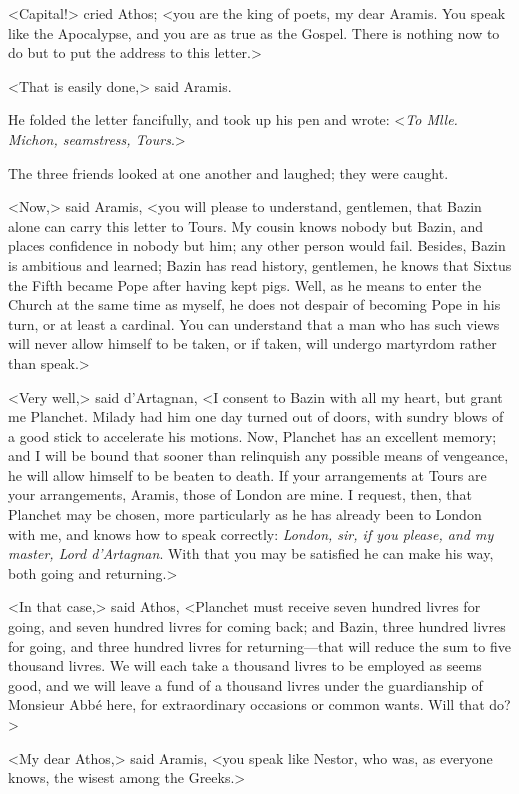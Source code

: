 <Capital!> cried Athos; <you are the king of poets, my dear Aramis. You speak like the Apocalypse, and you are as true as the Gospel. There is nothing now to do but to put the address to this letter.> 

<That is easily done,> said Aramis. 

He folded the letter fancifully, and took up his pen and wrote: <\textit{To Mlle. Michon, seamstress, Tours}.> 

The three friends looked at one another and laughed; they were caught. 

<Now,> said Aramis, <you will please to understand, gentlemen, that Bazin alone can carry this letter to Tours. My cousin knows nobody but Bazin, and places confidence in nobody but him; any other person would fail. Besides, Bazin is ambitious and learned; Bazin has read history, gentlemen, he knows that Sixtus the Fifth became Pope after having kept pigs. Well, as he means to enter the Church at the same time as myself, he does not despair of becoming Pope in his turn, or at least a cardinal. You can understand that a man who has such views will never allow himself to be taken, or if taken, will undergo martyrdom rather than speak.> 

<Very well,> said d'Artagnan, <I consent to Bazin with all my heart, but grant me Planchet. Milady had him one day turned out of doors, with sundry blows of a good stick to accelerate his motions. Now, Planchet has an excellent memory; and I will be bound that sooner than relinquish any possible means of vengeance, he will allow himself to be beaten to death. If your arrangements at Tours are your arrangements, Aramis, those of London are mine. I request, then, that Planchet may be chosen, more particularly as he has already been to London with me, and knows how to speak correctly: \textit{London, sir, if you please, and my master, Lord d'Artagnan}. With that you may be satisfied he can make his way, both going and returning.>

<In that case,> said Athos, <Planchet must receive seven hundred livres for going, and seven hundred livres for coming back; and Bazin, three hundred livres for going, and three hundred livres for returning---that will reduce the sum to five thousand livres. We will each take a thousand livres to be employed as seems good, and we will leave a fund of a thousand livres under the guardianship of Monsieur Abbé here, for extraordinary occasions or common wants. Will that do?> 

<My dear Athos,> said Aramis, <you speak like Nestor, who was, as everyone knows, the wisest among the Greeks.> 

